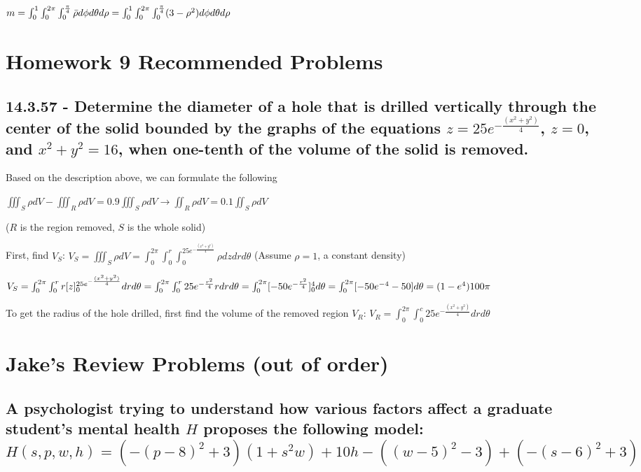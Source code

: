 \documentclass{article}
\begin{document}
\par\noindent\Large $m = \int_{0}^{1}\int_{0}^{2\pi}\int_{0}^{\frac{\pi}{4}}\Bar{\rho}d\phi d\theta d\rho = \int_{0}^{1}\int_{0}^{2\pi}\int_{0}^{\frac{\pi}{4}}(3 - \rho^{2})d\phi d\theta d\rho$
\section{Homework 9 Recommended Problems}

\subsection{14.3.57 - Determine the diameter of a hole that is drilled vertically through the center of the solid bounded by the graphs of the equations $z = 25e^{-\frac{(x^{2} + y^{2})}{4}}$, $z = 0$, and $x^{2} + y^{2} = 16$, when one-tenth of the volume of the solid is removed.}

\par\noindent\large Based on the description above, we can formulate the following
\par\noindent\Large $\iiint_{S}\rho dV - \iiint_{R}\rho dV = 0.9\iiint_{S}\rho dV \rightarrow \iint_{R}\rho dV = 0.1\iint_{S}\rho dV$ 
\par\noindent\large ($R$ is the region removed, $S$ is the whole solid) 
\par\noindent\large First, find $V_{S}$: \Large $V_{S} = \iiint_{S}\rho dV = \int_{0}^{2\pi}\int_{0}^{r}\int_{0}^{25e^{-\frac{(x^{2} + y^{2})}{4}}}\rho dzdrd\theta$ \large (Assume $\rho = 1$, a constant density)
\par\noindent\Large $V_{S} = \int_{0}^{2\pi}\int_{0}^{r}r[z]_{0}^{25e^{-\frac{(x^{2} + y^{2})}{4}}}drd\theta = \int_{0}^{2\pi}\int_{0}^{r}25e^{-\frac{r^{2}}{4}}rdrd\theta = \int_{0}^{2\pi}[-50e^{-\frac{r^{2}}{4}}]_{0}^{4}d\theta = \linebreak \int_{0}^{2\pi}[-50e^{-4} - 50]d\theta = (1 - e^{4})100\pi$\vspace{0.25cm}

\par\noindent\large To get the radius of the hole drilled, first find the volume of the removed region $V_{R}$: $V_{R} = \int_{0}^{2\pi}\int_{0}^{c}25e^{-\frac{(x^{2} + y^{2})}{4}}drd\theta$

\section{Jake's Review Problems (out of order)}
\subsection{A psychologist trying to understand how various factors affect a graduate student’s mental health $H$ proposes the following model: $H(s, p, w, h) = (-(p - 8)^{2} + 3)(1 + s^{2}w) + 10h - ((w - 5)^{2} - 3) + (-(s - 6)^{2} + 3)$}
\end{document}
